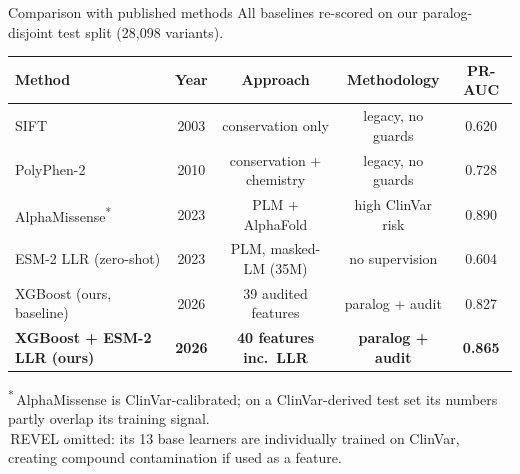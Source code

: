 \begin{frame}{Comparison with published methods}
  \centering
  \footnotesize
  All baselines re-scored on our paralog-disjoint test split (28{,}098 variants).

  \vspace{0.6em}
  \begin{tabular}{@{}lcccc@{}}
    \toprule
    \textbf{Method}                         & \textbf{Year} & \textbf{Approach}            & \textbf{Methodology} & \textbf{PR-AUC} \\
    \midrule
    SIFT                                    & 2003 & conservation only          & legacy, no guards & 0.620 \\
    PolyPhen-2                              & 2010 & conservation + chemistry   & legacy, no guards & 0.728 \\
    AlphaMissense\textsuperscript{*}        & 2023 & PLM + AlphaFold            & high ClinVar risk & 0.890 \\
    ESM-2 LLR (zero-shot)                   & 2023 & PLM, masked-LM (35M)       & no supervision    & 0.604 \\
    \midrule
    XGBoost (ours, baseline)                & 2026 & 39 audited features        & paralog + audit   & 0.827 \\
    \rowcolor{kkugold!20}
    \textbf{XGBoost + ESM-2 LLR (ours)}     & \textbf{2026} & \textbf{40 features inc.\ LLR} & \textbf{paralog + audit} & \textbf{0.865} \\
    \bottomrule
  \end{tabular}

  \vspace{0.8em}
  \scriptsize
  \textsuperscript{*}\,AlphaMissense is ClinVar-calibrated; on a ClinVar-derived test set its numbers partly overlap its training signal.\\
  \,REVEL omitted: its 13 base learners are individually trained on ClinVar, creating compound contamination if used as a feature.
\end{frame}


